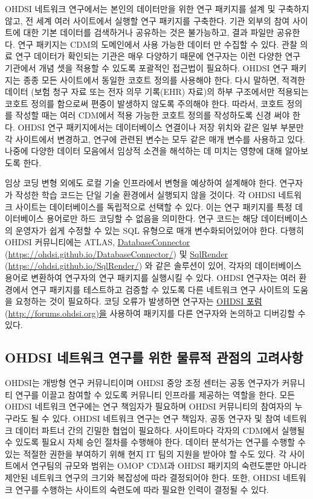 \documentclass[10.5pt]{book}
\theoremstyle{definition}
\theoremstyle{definition}
\theoremstyle{definition}
\theoremstyle{remark}
\begin{document}
OHDSI 네트워크 연구에서는 본인의 데이터만을 위한 연구 패키지를 설계 및
구축하지 않고, 전 세계 여러 사이트에서 실행할 연구 패키지를 구축한다.
기관 외부의 참여 사이트에 대한 기본 데이터를 검색하거나 공유하는 것은
불가능하고, 결과 파일만 공유한다. 연구 패키지는 CDM의 도메인에서 사용
가능한 데이터 만 수집할 수 있다. 관찰 의료 연구 데이터가 확인되는 기관은
매우 다양하기 때문에 연구자는 이런 다양한 연구 기관에서 개념 셋을 적용할
수 있도록 포괄적인 접근법이 필요하다. OHDSI 연구 패키지는 종종 모든
사이트에서 동일한 코호트 정의를 사용해야 한다. 다시 말하면, 적격한
데이터 (보험 청구 자료 또는 전자 의무 기록(EHR) 자료)의 하부 구조에서만
적용되는 코호트 정의를 함으로써 편중이 발생하지 않도록 주의해야 한다.
따라서, 코호트 정의를 작성할 때는 여러 CDM에서 적용 가능한 코호트 정의를
작성하도록 신경 써야 한다. OHDSI 연구 패키지에서는 데이터베이스 연결이나
저장 위치와 같은 일부 부분만 각 사이트에서 변경하고, 연구에 관련된
변수는 모두 같은 매개 변수를 사용하고 있다. 나중에 다양한 데이터
모음에서 임상적 소견을 해석하는 데 미치는 영향에 대해 알아보도록 한다.

임상 코딩 변형 외에도 로컬 기술 인프라에서 변형을 예상하여 설계해야
한다. 연구자가 작성한 학습 코드는 단일 기술 환경에서 실행되지 않을
것이다. 각 OHDSI 네트워크 사이트는 데이터베이스를 독립적으로 선택할 수
있다. 이는 연구 패키지를 특정 데이터베이스 용어로만 하드 코딩할 수
없음을 의미한다. 연구 코드는 해당 데이터베이스의 운영자가 쉽게 수정할 수
있는 SQL 유형으로 매개 변수화되어있어야 한다. 다행히 OHDSI 커뮤니티에는
ATLAS, \protect\hyperlink{DatabaseConnector}{DatabaseConnector}
(\url{https://ohdsi.github.io/DatabaseConnector/}) 및
\protect\hyperlink{SqlRender}{SqlRender}
(\url{https://ohdsi.github.io/SqlRender/}) 와 같은 솔루션이 있어, 각자의
데이터베이스 용어로 변환하여 연구자의 연구 패키지를 실행시킬 수 있다.
OHDSI 연구자는 여러 환경에서 연구 패키지를 테스트하고 검증할 수 있도록
다른 네트워크 연구 사이트의 도움을 요청하는 것이 필요하다. 코딩 오류가
발생하면 연구자는 \protect\hyperlink{ohdsi-}{OHDSI 포럼}
(\url{http://forums.ohdsi.org)을} 사용하여 패키지를 다른 연구자와
논의하고 디버깅할 수 있다.

\subsection{OHDSI 네트워크 연구를 위한 물류적 관점의
고려사항}\label{ohdsi------}


OHDSI는 개방형 연구 커뮤니티이며 OHDSI 중앙 조정 센터는 공동 연구자가
커뮤니티 연구를 이끌고 참여할 수 있도록 커뮤니티 인프라를 제공하는
역할을 한다. 모든 OHDSI 네트워크 연구에는 연구 책임자가 필요하며 OHDSI
커뮤니티의 참여자의 누구라도 될 수 있다. OHDSI 네트워크 연구는 연구
책임자, 공동 연구자 및 참여 네트워크 데이터 파트너 간의 긴밀한 협업이
필요하다. 사이트마다 각자의 CDM에서 실행될 수 있도록 필요시 자체 승인
절차를 수행해야 한다. 데이터 분석가는 연구를 수행할 수 있는 적절한
권한을 부여하기 위해 현지 IT 팀의 지원을 받아야 할 수도 있다. 각
사이트에서 연구팀의 규모와 범위는 OMOP CDM과 OHDSI 패키지의 숙련도뿐만
아니라 제안된 네트워크 연구의 크기와 복잡성에 따라 결정되어야 한다.
또한, OHDSI 네트워크 연구를 수행하는 사이트의 숙련도에 따라 필요한
인력이 결정될 수 있다.
\end{document}
